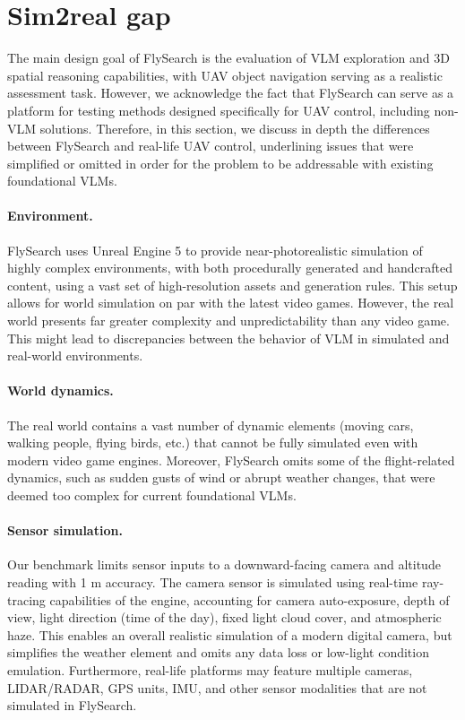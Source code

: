 \section{Sim2real gap}
The main design goal of FlySearch is the evaluation of VLM exploration and 3D spatial reasoning capabilities, with UAV object navigation serving as a realistic assessment task. However, we acknowledge the fact that FlySearch can serve as a platform for testing methods designed specifically for UAV control, including non-VLM solutions. Therefore, in this section, we discuss in depth the differences between FlySearch and real-life UAV control, underlining issues that were simplified or omitted in order for the problem to be addressable with existing foundational VLMs.

\paragraph{Environment.} FlySearch uses Unreal Engine 5 to provide near-photorealistic simulation of highly complex environments, with both procedurally generated and handcrafted content, using a vast set of high-resolution assets and generation rules. This setup allows for world simulation on par with the latest video games. However, the real world presents far greater complexity and unpredictability than any video game. This might lead to discrepancies between the behavior of VLM in simulated and real-world environments.
\paragraph{World dynamics.} The real world contains a vast number of dynamic elements (moving cars, walking people, flying birds, etc.) that cannot be fully simulated even with modern video game engines. Moreover, FlySearch omits some of the flight-related dynamics, such as sudden gusts of wind or abrupt weather changes, that were deemed too complex for current foundational VLMs.
\paragraph{Sensor simulation.} Our benchmark limits sensor inputs to a downward-facing camera and altitude reading with 1 m accuracy. The camera sensor is simulated using real-time ray-tracing capabilities of the engine, accounting for camera auto-exposure, depth of view, light direction (time of the day), fixed light cloud cover, and atmospheric haze. This enables an overall realistic simulation of a modern digital camera, but simplifies the weather element and omits any data loss or low-light condition emulation. Furthermore, real-life platforms may feature multiple cameras, LIDAR/RADAR, GPS units, IMU, and other sensor modalities that are not simulated in FlySearch.

